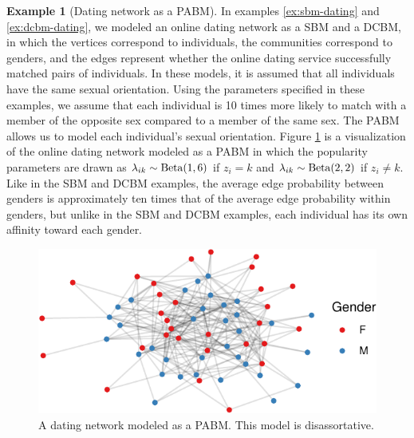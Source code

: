 \documentclass[
  12pt,
]{article}
\theoremstyle{definition}
\theoremstyle{definition}
\newtheorem{example}{Example}[section]
\theoremstyle{definition}
\theoremstyle{definition}
\theoremstyle{remark}
\begin{document}
\begin{example}[Dating network as a PABM]
\label{ex:pabm-dating}
In examples \ref{ex:sbm-dating} and \ref{ex:dcbm-dating}, we modeled an online dating network as a SBM and a DCBM, in which the vertices correspond to individuals, the communities correspond to genders, and the edges represent whether the online dating service successfully matched pairs of individuals. 
In these models, it is assumed that all individuals have the same sexual orientation. 
Using the parameters specified in these examples, we assume that each individual is 10 times more likely to match with a member of the opposite sex compared to a member of the same sex. 
The PABM allows us to model each individual's sexual orientation. 
Figure \ref{fig:dating-pabm} is a visualization of the online dating network modeled as a PABM in which the popularity parameters are drawn as $\lambda_{ik} \sim \mathrm{Beta}(1, 6)$ if $z_i = k$ and $\lambda_{ik} \sim \mathrm{Beta}(2, 2)$ if $z_i \neq k$. 
Like in the SBM and DCBM examples, the average edge probability between genders is approximately ten times that of the average edge probability within genders, but unlike in the SBM and DCBM examples, each individual has its own affinity toward each gender. 

\begin{figure}[H]

{\centering \includegraphics{draft_files/figure-latex/dating-pabm-1} 

}

\caption{A dating network modeled as a PABM. This model is disassortative.}\label{fig:dating-pabm}
\end{figure}
\end{example}
\end{document}
